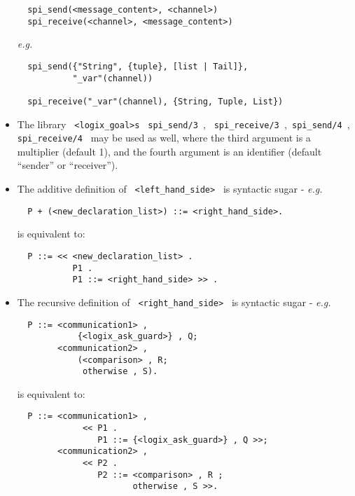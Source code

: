 \begin{itemize}
\begin{verbatim}
  spi_send(<message_content>, <channel>)
  spi_receive(<channel>, <message_content>)
\end{verbatim}

\newpage
\noindent
{\em e.g.}

\begin{verbatim}
  spi_send({"String", {tuple}, [list | Tail]},
           "_var"(channel))

  spi_receive("_var"(channel), {String, Tuple, List})
\end{verbatim}

\item
The library \verb+ <logix_goal>s+ \verb+ spi_send/3 +,
\verb+ spi_receive/3 +,\linebreak \verb+ spi_send/4 +, \verb+ spi_receive/4 + may be
used as well, where the third argument is a multiplier (default 1), and
the fourth argument is an identifier (default ``sender'' or ``receiver'').

\item
The additive definition of \verb+ <left_hand_side> + is syntactic sugar
- {\em e.g.}

\begin{verbatim}
  P + (<new_declaration_list>) ::= <right_hand_side>.
\end{verbatim}

\noindent
is equivalent to:

\begin{verbatim}
  P ::= << <new_declaration_list> .
           P1 .
           P1 ::= <right_hand_side> >> .
\end{verbatim}

\item
The recursive definition of \verb+ <right_hand_side> + is syntactic
sugar - {\em e.g.}

\begin{verbatim}
  P ::= <communication1> ,
            {<logix_ask_guard>} , Q;
        <communication2> ,
            (<comparison> , R;
             otherwise , S).
\end{verbatim}

\noindent
is equivalent to:

\begin{verbatim}
  P ::= <communication1> ,
             << P1 .
                P1 ::= {<logix_ask_guard>} , Q >>;
        <communication2> ,
             << P2 .
                P2 ::= <comparison> , R ;
                       otherwise , S >>.
\end{verbatim}


\end{itemize}
